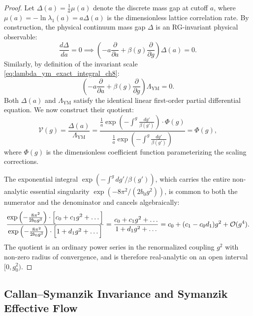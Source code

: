 \begin{proof}
Let $\Delta(a) = \frac{1}{a} \mu(a)$ denote the discrete mass gap at cutoff $a$, where $\mu(a) = -\ln \lambda_1(a) = a \Delta(a)$ is the dimensionless lattice correlation rate. By construction, the physical continuum mass gap $\Delta$ is an RG-invariant physical observable:
\begin{equation}
\label{eq:rg_invariance_delta}
\frac{d\Delta}{da} = 0 \implies \left( -a \frac{\partial}{\partial a} + \beta(g) \frac{\partial}{\partial g} \right) \Delta(a) = 0.
\end{equation}
Similarly, by definition of the invariant scale \eqref{eq:lambda_ym_exact_integral_ch8}:
\begin{equation}
\label{eq:rg_invariance_lambda_ch8}
\left( -a \frac{\partial}{\partial a} + \beta(g) \frac{\partial}{\partial g} \right) \Lambda_{\mathrm{YM}} = 0.
\end{equation}
Both $\Delta(a)$ and $\Lambda_{\mathrm{YM}}$ satisfy the identical linear first-order partial differential equation. We now construct their quotient:
\begin{equation}
\label{eq:ratio_quotient_cs}
\mathcal{V}(g) = \frac{\Delta(a)}{\Lambda_{\mathrm{YM}}} = \frac{\frac{1}{a} \exp\left( -\int^{g} \frac{dg'}{\beta(g')} \right) \cdot \Phi(g)}{\frac{1}{a} \exp\left( -\int^{g} \frac{dg'}{\beta(g')} \right)} = \Phi(g),
\end{equation}
where $\Phi(g)$ is the dimensionless coefficient function parameterizing the scaling corrections.

The exponential integral $\exp(-\int^g dg'/\beta(g'))$, which carries the entire non-analytic essential singularity $\exp(-8\pi^2/(2b_0 g^2))$, is common to both the numerator and the denominator and cancels algebraically:
\begin{equation}
\frac{\exp\left( -\frac{8\pi^2}{2b_0 g^2} \right) \cdot \Bigl[ c_0 + c_1 g^2 + \dots \Bigr]}{\exp\left( -\frac{8\pi^2}{2b_0 g^2} \right) \cdot \Bigl[ 1 + d_1 g^2 + \dots \Bigr]} = \frac{c_0 + c_1 g^2 + \dots}{1 + d_1 g^2 + \dots} = c_0 + (c_1 - c_0 d_1) g^2 + \mathcal{O}(g^4).
\end{equation}
The quotient is an ordinary power series in the renormalized coupling $g^2$ with non-zero radius of convergence, and is therefore real-analytic on an open interval $[0, g_0^2)$.
\end{proof}

\subsection{Callan--Symanzik Invariance and Symanzik Effective Flow}
\label{subsec:callan_symanzik_symanzik_flow}

